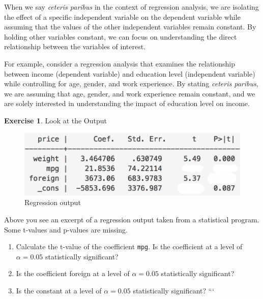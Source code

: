 \documentclass[
  12pt,
  oneside]{book}
\providecommand{\tightlist}{%
  \setlength{\itemsep}{0pt}\setlength{\parskip}{0pt}}
\theoremstyle{definition}
\theoremstyle{definition}
\theoremstyle{definition}
\newtheorem{exercise}{Exercise}[chapter]
\theoremstyle{definition}
\theoremstyle{remark}
\begin{document}
When we say \emph{ceteris paribus} in the context of regression analysis, we are isolating the effect of a specific independent variable on the dependent variable while assuming that the values of the other independent variables remain constant. By holding other variables constant, we can focus on understanding the direct relationship between the variables of interest.

For example, consider a regression analysis that examines the relationship between income (dependent variable) and education level (independent variable) while controlling for age, gender, and work experience. By stating \emph{ceteris paribus}, we are assuming that age, gender, and work experience remain constant, and we are solely interested in understanding the impact of education level on income.

\begin{exercise}
\protect\hypertarget{exr:lookatoutput}{}\label{exr:lookatoutput}Look at the Output
\end{exercise}

\begin{figure}

{\centering \includegraphics[width=13.43in]{fig/reg_stata2} 

}

\caption{Regression output}\label{fig:regstata2}
\end{figure}

Above you see an excerpt of a regression output taken from a statistical program. Some t-values and p-values are missing.

\begin{enumerate}
\def\labelenumi{\alph{enumi})}
\tightlist
\item
  Calculate the t-value of the coefficient \texttt{mpg}. Is the coefficient at a level of \(\alpha=0.05\) statistically significant?\\
\item
  Is the coefficient foreign at a level of \(\alpha=0.05\) statistically significant?\\
\item
  Is the constant at a level of \(\alpha=0.05\) statistically significant?
  ```
\end{enumerate}
\end{document}
